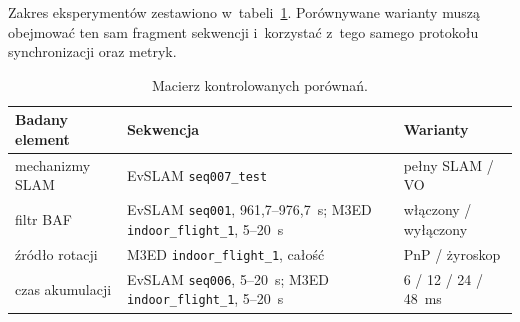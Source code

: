 Zakres eksperymentów zestawiono w~tabeli~\ref{tab:macierz_eksperymentow}. Porównywane warianty muszą obejmować ten sam fragment sekwencji i~korzystać z~tego samego protokołu synchronizacji oraz metryk.

\begin{table}[!ht]
    \centering
    \footnotesize
    \caption{Macierz kontrolowanych porównań.}
    \label{tab:macierz_eksperymentow}
    \begin{tabularx}{\textwidth}{p{} p{} X}
        \toprule
        Badany element & Sekwencja & Warianty \\
        \midrule
        mechanizmy SLAM & EvSLAM \texttt{seq007\_test} & pełny SLAM / VO \\
        filtr BAF & EvSLAM \texttt{seq001}, 961,7--976,7~s; M3ED \texttt{indoor\_flight\_1}, 5--20~s & włączony / wyłączony \\
        źródło rotacji & M3ED \texttt{indoor\_flight\_1}, całość & PnP / żyroskop \\
        czas akumulacji & EvSLAM \texttt{seq006}, 5--20~s; M3ED \texttt{indoor\_flight\_1}, 5--20~s & 6 / 12 / 24 / 48~ms \\
        \bottomrule
    \end{tabularx}
\end{table}
